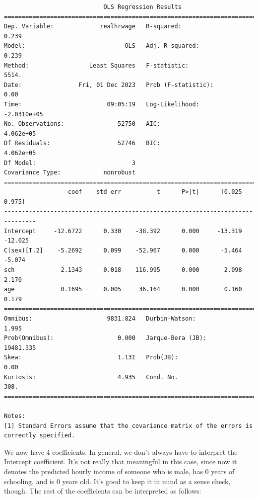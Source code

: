 \documentclass[
  letterpaper,
  DIV=11,
  numbers=noendperiod]{scrreprt}
\begin{document}
\begin{verbatim}
                            OLS Regression Results                            
==============================================================================
Dep. Variable:             realhrwage   R-squared:                       0.239
Model:                            OLS   Adj. R-squared:                  0.239
Method:                 Least Squares   F-statistic:                     5514.
Date:                Fri, 01 Dec 2023   Prob (F-statistic):               0.00
Time:                        09:05:19   Log-Likelihood:            -2.0310e+05
No. Observations:               52750   AIC:                         4.062e+05
Df Residuals:                   52746   BIC:                         4.062e+05
Df Model:                           3                                         
Covariance Type:            nonrobust                                         
===============================================================================
                  coef    std err          t      P>|t|      [0.025      0.975]
-------------------------------------------------------------------------------
Intercept     -12.6722      0.330    -38.392      0.000     -13.319     -12.025
C(sex)[T.2]    -5.2692      0.099    -52.967      0.000      -5.464      -5.074
sch             2.1343      0.018    116.995      0.000       2.098       2.170
age             0.1695      0.005     36.164      0.000       0.160       0.179
==============================================================================
Omnibus:                     9831.824   Durbin-Watson:                   1.995
Prob(Omnibus):                  0.000   Jarque-Bera (JB):            19481.335
Skew:                           1.131   Prob(JB):                         0.00
Kurtosis:                       4.935   Cond. No.                         308.
==============================================================================

Notes:
[1] Standard Errors assume that the covariance matrix of the errors is correctly specified.
\end{verbatim}

We now have 4 coefficients. In general, we don't always have to
interpret the Intercept coefficient. It's not really that meaningful in
this case, since now it denotes the predicted hourly income of someone
who is male, has 0 years of schooling, and is 0 years old. It's good to
keep it in mind as a sense check, though. The rest of the coefficients
can be interpreted as follows:
\end{document}
